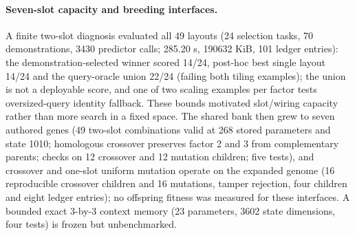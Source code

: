 \documentclass[11pt]{article}
\begin{document}
\paragraph{Seven-slot capacity and breeding interfaces.} A finite two-slot diagnosis evaluated all
49 layouts (24 selection tasks, 70 demonstrations, 3430 predictor calls; 285.20 s, 190632 KiB,
101 ledger entries): the demonstration-selected winner scored 14/24, post-hoc best single layout
14/24 and the query-oracle union 22/24 (failing both tiling examples); the union is not a
deployable score, and one of two scaling examples per factor tests oversized-query identity fallback.
These bounds motivated slot/wiring capacity rather than more search in a fixed space. The shared bank
then grew to seven authored genes (49 two-slot combinations valid at 268 stored parameters and state
1010; homologous crossover preserves factor 2 and 3 from complementary parents; checks on 12
crossover and 12 mutation children; five tests), and crossover and one-slot uniform mutation operate on
the expanded genome (16 reproducible crossover children and 16 mutations, tamper rejection, four
children and eight ledger entries); no offspring fitness was measured for these interfaces. A
bounded exact 3-by-3 context memory (23 parameters, 3602 state dimensions, four tests) is frozen but
unbenchmarked.
\end{document}
